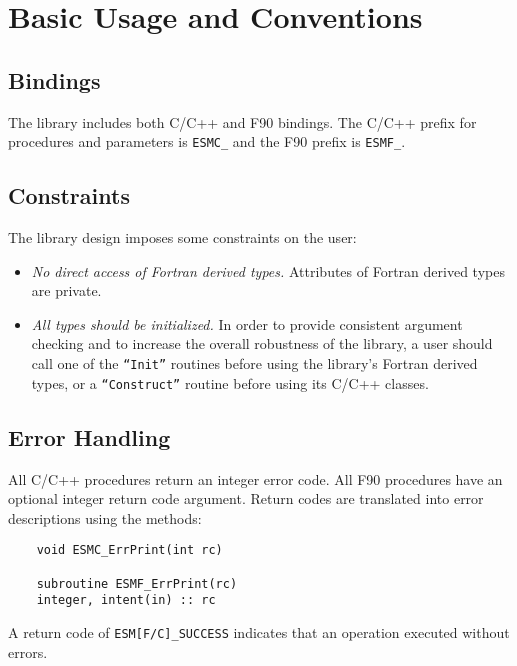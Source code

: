 
\section{Basic Usage and Conventions}

\subsection{Bindings}

The library includes both C/C++ and F90 bindings.  The C/C++ prefix for
procedures and parameters is {\tt ESMC\_} and the F90 prefix is {\tt ESMF\_}.

\subsection{Constraints}

The library design imposes some constraints on the user:

\begin{itemize}
\item {\it No direct access of Fortran derived types.}  Attributes
of Fortran derived types are private.

\item{\it All types should be initialized.} In order to provide consistent
argument checking and to increase the overall robustness of the library,
a user should call one of the {\tt ``Init''} routines before using the
library's Fortran derived types, or a {\tt ``Construct''} routine before 
using its C/C++ classes.

\end{itemize}

\subsection{Error Handling}

All C/C++ procedures return an integer error code.  All F90 procedures have 
an optional integer return code argument.  Return codes are translated 
into error descriptions using the methods: 

\begin{verbatim}
    void ESMC_ErrPrint(int rc)

    subroutine ESMF_ErrPrint(rc)  
    integer, intent(in) :: rc
\end{verbatim}

A return code of {\tt ESM[F/C]\_SUCCESS} indicates that an 
operation executed without errors.

